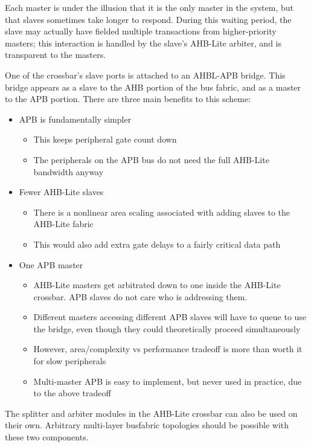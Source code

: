 \documentclass[notitlepage]{article}
\begin{document}
Each master is under the illusion that it is the only master in the system, but that slaves sometimes take longer to respond. During this waiting period, the slave may actually have fielded multiple transactions from higher-priority masters; this interaction is handled by the slave's AHB-Lite arbiter, and is transparent to the masters.

One of the crossbar's slave ports is attached to an AHBL-APB bridge. This bridge appears as a slave to the AHB portion of the bus fabric, and as a master to the APB portion. There are three main benefits to this scheme:

\begin{itemize}
	\item APB is fundamentally simpler
	\begin{itemize}
		\item This keeps peripheral gate count down
		\item The peripherals on the APB bus do not need the full AHB-Lite bandwidth anyway
	\end{itemize}
	\item Fewer AHB-Lite slaves
	\begin{itemize}
		\item There is a nonlinear area scaling associated with adding slaves to the AHB-Lite fabric
		\item This would also add extra gate delays to a fairly critical data path
	\end{itemize}
	\item One APB master
	\begin{itemize}
		\item AHB-Lite masters get arbitrated down to one inside the AHB-Lite crossbar. APB slaves do not care who is addressing them.
		\item Different masters accessing different APB slaves will have to queue to use the bridge, even though they could theoretically proceed simultaneously
		\item However, area/complexity vs performance tradeoff is more than worth it for slow peripherals
		\item Multi-master APB is easy to implement, but never used in practice, due to the above tradeoff
	\end{itemize}
\end{itemize}

The splitter and arbiter modules in the AHB-Lite crossbar can also be used on their own. Arbitrary multi-layer busfabric topologies should be possible with these two components.
\end{document}
